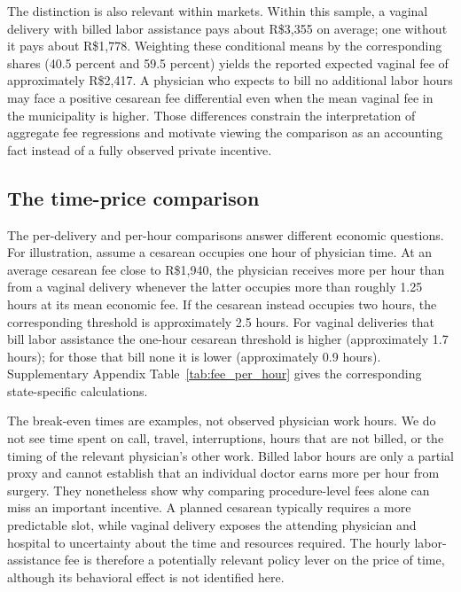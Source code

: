 \documentclass[12pt]{article}
\newcommand{\satab}[1]{Supplementary Appendix Table~\ref{#1}}
\begin{document}
The distinction is also relevant within markets. Within this sample, a vaginal delivery with billed labor assistance pays about R\$3,355 on average; one without it pays about R\$1,778. Weighting these conditional means by the corresponding shares (40.5 percent and 59.5 percent) yields the reported expected vaginal fee of approximately R\$2,417. A physician who expects to bill no additional labor hours may face a positive cesarean fee differential even when the mean vaginal fee in the municipality is higher. Those differences constrain the interpretation of aggregate fee regressions and motivate viewing the comparison as an accounting fact instead of a fully observed private incentive.
\subsection{The time-price comparison}\label{sec:time_price}

The per-delivery and per-hour comparisons answer different economic questions. For illustration, assume a cesarean occupies one hour of physician time. At an average cesarean fee close to R\$1,940, the physician receives more per hour than from a vaginal delivery whenever the latter occupies more than roughly 1.25 hours at its mean economic fee. If the cesarean instead occupies two hours, the corresponding threshold is approximately 2.5 hours. For vaginal deliveries that bill labor assistance the one-hour cesarean threshold is higher (approximately 1.7 hours); for those that bill none it is lower (approximately 0.9 hours). \satab{tab:fee_per_hour} gives the corresponding state-specific calculations.

The break-even times are examples, not observed physician work hours. We do not see time spent on call, travel, interruptions, hours that are not billed, or the timing of the relevant physician's other work. Billed labor hours are only a partial proxy and cannot establish that an individual doctor earns more per hour from surgery. They nonetheless show why comparing procedure-level fees alone can miss an important incentive. A planned cesarean typically requires a more predictable slot, while vaginal delivery exposes the attending physician and hospital to uncertainty about the time and resources required. The hourly labor-assistance fee is therefore a potentially relevant policy lever on the price of time, although its behavioral effect is not identified here.
\end{document}
